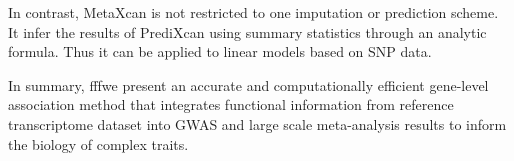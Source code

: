 \documentclass[10pt]{article}
\begin{document}
In contrast, MetaXcan is not restricted to one imputation or prediction scheme. It
infer the results of PrediXcan using summary statistics through an analytic formula. Thus it can be applied to linear models based on SNP data.

%
%
%

In summary, fffwe present an accurate and computationally efficient gene-level association method that integrates functional information from reference transcriptome dataset into GWAS and large scale meta-analysis results to inform the biology of complex traits.
%
%
%


%
\end{document}
